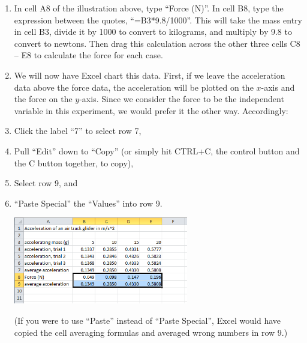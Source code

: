 \begin{enumerate}[label=\arabic*.]
\item In cell A8 of the illustration above, type ``Force (N)''.  In cell B8, type the expression between the quotes, ``=B3*9.8/1000''.  This will take the mass entry in cell B3, divide it by 1000 to convert to kilograms, and multiply by 9.8 to convert to newtons.  Then drag this calculation across the other three cells C8 -- E8 to calculate the force for each case.

\item We will now have Excel chart this data.  First, if we leave the acceleration data above the force data, the acceleration will be plotted on the \(x\)-axis and the force on the \(y\)-axis.  Since we consider the force to be the independent variable in this experiment, we would prefer it the other way.  Accordingly:
\squishlist
\item Click the label ``7'' to select row 7,
\item Pull ``Edit'' down to ``Copy'' (or simply hit CTRL+C, the control button and the C button together, to copy),
\item Select row 9, and
\item ``Paste Special'' the ``Values'' into row 9.
\squishend

\begin{center} \includegraphics*[width=0.6\textwidth]{imgs/6labs/6Alab/6Aexp3/6A_exp3_Excel_Spreadsheet3.png} \end{center}
(If you were to use ``Paste'' instead of ``Paste Special'', Excel would have copied the cell averaging formulas and averaged wrong numbers in row 9.)


\end{enumerate}
